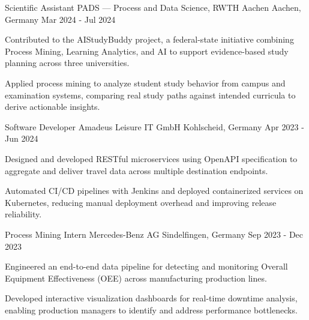 \begin{cventries}
  \cventry
    {Scientific Assistant} %
    {PADS — Process and Data Science, RWTH Aachen} %
    {Aachen, Germany} %
    {Mar 2024 - Jul 2024} %
    {
      \begin{cvitems} %
        \item {Contributed to the AIStudyBuddy project, a federal-state initiative combining Process Mining, Learning Analytics, and AI to support evidence-based study planning across three universities.}
        \item {Applied process mining to analyze student study behavior from campus and examination systems, comparing real study paths against intended curricula to derive actionable insights.}
      \end{cvitems}
    }

  \cventry
    {Software Developer} %
    {Amadeus Leisure IT GmbH} %
    {Kohlscheid, Germany} %
    {Apr 2023 - Jun 2024} %
    {
      \begin{cvitems} %
        \item {Designed and developed RESTful microservices using OpenAPI specification to aggregate and deliver travel data across multiple destination endpoints.}
        \item {Automated CI/CD pipelines with Jenkins and deployed containerized services on Kubernetes, reducing manual deployment overhead and improving release reliability.}
      \end{cvitems}
    }

  \cventry
    {Process Mining Intern} %
    {Mercedes-Benz AG} %
    {Sindelfingen, Germany} %
    {Sep 2023 - Dec 2023} %
    {
      \begin{cvitems} %
        \item {Engineered an end-to-end data pipeline for detecting and monitoring Overall Equipment Effectiveness (OEE) across manufacturing production lines.}
        \item {Developed interactive visualization dashboards for real-time downtime analysis, enabling production managers to identify and address performance bottlenecks.}
      \end{cvitems}
    }


\end{cventries}
